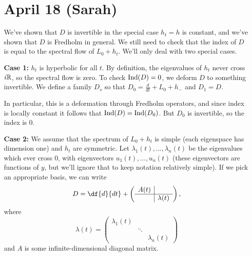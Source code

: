 \section*{\textbf{April 18 (Sarah)}}
We've shown that $D$ is invertible in the special case $h_t=h$ is constant, and we've shown that $D$ is Fredholm in general. We still need to check that the index of $D$ is equal to the spectral flow of $L_0+h_t$. We'll only deal with two special cases.

\medskip

{\bf Case 1:} $h_t$ is hyperbolic for all $t$. By definition, the eigenvalues of $h_t$ never cross $i\mathbb{R}$, so the spectral flow is zero. To check $\mathrm{Ind}(D)=0$, we deform $D$ to something invertible. We define a family $D_s$ so that $D_0=\tfrac{d}{dt}+L_0+h_-$ and $D_1=D$.
\begin{center}
\end{center}
In particular, this is a deformation through Fredholm operators, and since index is locally constant it follows that $\mathrm{Ind}(D)=\mathrm{Ind}(D_0)$. But $D_0$ is invertible, so the index is $0$.

\medskip

{\bf Case 2:} We assume that the spectrum of $L_0+h_t$ is simple (each eigenspace has dimension one) and $h_t$ are symmetric. Let $\lambda_1(t),\ldots,\lambda_n(t)$ be the eigenvalues which ever cross $0$, with eigenvectors $u_1(t),\ldots,u_n(t)$ (these eigenvectors are functions of $y$, but we'll ignore that to keep notation relatively simple). If we pick an appropriate basis, we can write
\[
D = \df{d}{dt} + \begin{pmatrix} \begin{array}{c|c}
A(t)
\\
\hline
& \lambda(t)
\end{array} \end{pmatrix},
\]
where
\[
\lambda(t) = \begin{pmatrix}
\lambda_1(t)
\\
& \ddots
\\
&& \lambda_n(t)
\end{pmatrix}
\]
and $A$ is some infinite-dimensional diagonal matrix. 

